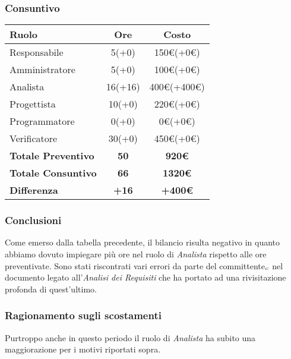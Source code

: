 {{{{{{{{{{	\subsubsection{Consuntivo}\label{ConsuntivoTerzoPeriodoDiProgettazioneDiDettaglioCodificaIncrementiCosto}

	\quad
	\def\tabularxcolumn#1{m{#1}}
	{
		\begin{center}
			\renewcommand{\arraystretch}{1.4}
			\begin{tabularx}{10cm}{|X|c|c|}
				\hline
				\rowcolor{airforceblue}
				\textbf{Ruolo} & \textbf{Ore} & \textbf{Costo}\\
				\hline
				Responsabile & 5(+0) & 150\euro(+0\euro)\\
				\hline
				Amministratore & 5(+0) & 100\euro(+0\euro)\\
				\hline
				Analista & 16(+16) & 400\euro(+400\euro)\\
				\hline
				Progettista & 10(+0) & 220\euro(+0\euro)\\
				\hline
				Programmatore & 0(+0) & 0\euro(+0\euro)\\
				\hline
				Verificatore & 30(+0) & 450\euro(+0\euro)\\
				\hline
				\textbf{Totale Preventivo} & \textbf{50} & \textbf{920\euro}\\
				\hline
				\textbf{Totale Consuntivo} & \textbf{66} & \textbf{1320\euro}\\
				\hline
				\textbf{Differenza} & \textbf{+16} & \textbf{+400\euro}
			\end{tabularx}
		\end{center}

\subsubsection{Conclusioni}\label{ConsuntivoTerzoPeriodoDiProgettazioneDiDettaglioCodificaConclusioni}
Come emerso dalla tabella precedente, il bilancio risulta negativo in quanto abbiamo dovuto impiegare più ore nel ruolo di \textit{Analista} rispetto alle ore preventivate. Sono stati riscontrati vari errori da parte del committente$_{\scaleto{G}{3pt}}$ nel documento legato all'\textit{Analisi dei Requisiti} che ha portato ad una rivisitazione profonda di quest'ultimo.


\subsubsection{Ragionamento sugli scostamenti}\label{ConsuntivoTerzoPeriodoDiProgettazioneDiDettaglioCodificaRagionamentoScostamenti}
Purtroppo anche in questo periodo il ruolo di \textit{Analista} ha subito una maggiorazione per i motivi riportati sopra.

}}}}}}}}}}}
